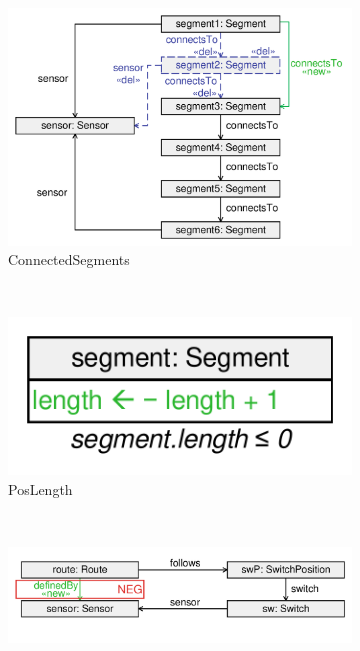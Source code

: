 \begin{itemize}
  
\begin{figure}
        \centering
        \begin{subfigure}[b]{\textwidth}
        		\centering
                \includegraphics[scale=0.2]{figures/transformation-repair-connectedsegments}
                \caption{\textsf{ConnectedSegments}}
                \label{fig:transformation-repair-connectedsegments}
        \end{subfigure}
        ~
        \begin{subfigure}[b]{\textwidth}
        		\centering
                \includegraphics[scale=0.2]{figures/transformation-repair-poslength}
                \caption{\textsf{PosLength}}
                \label{fig:transformation-repair-poslength}
        \end{subfigure}
        ~
        \begin{subfigure}[b]{\textwidth}
                \centering
                \includegraphics[scale=0.2]{figures/transformation-repair-routesensor}

\end{subfigure}
\end{figure}
\end{itemize}
